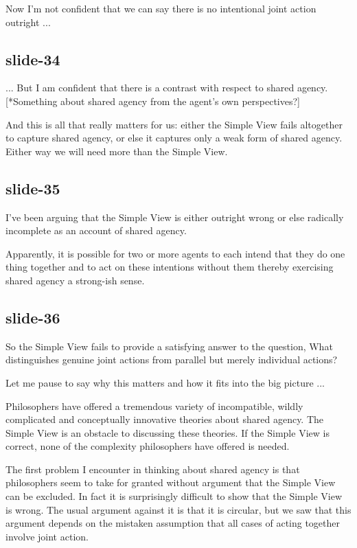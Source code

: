 \documentclass[12pt,\papersize]{extarticle}
\begin{document}
Now I’m not confident that we can say there is no intentional joint action
outright ...

\subsection{slide-34}
...  But I am confident that there is a contrast with respect to shared agency.
[*Something about shared agency from the agent’s own perspectives?]

And this is all that really matters for us: either the Simple View fails altogether
to capture shared agency, or else it captures only a weak form of shared agency.
Either way we will need more than the Simple View.

\subsection{slide-35}
I’ve been arguing that the Simple View is either outright wrong or else radically incomplete
as an account of shared agency.

Apparently, it is possible for two or more agents to each intend that
they do one thing together and to act on these intentions without them thereby
exercising shared agency a strong-ish sense.

\subsection{slide-36}
So the Simple View fails to provide a satisfying answer to the question, What distinguishes
genuine joint actions from parallel but merely individual actions?

Let me pause to say why this matters and how it fits into the big picture ...

Philosophers have offered a tremendous variety of incompatible, wildly complicated and
conceptually innovative theories about shared agency.
The Simple View is an obstacle to discussing these theories.
If the Simple View is correct, none of the complexity philosophers have offered is needed.

The first problem I encounter in thinking about shared agency is that philosophers
seem to take for granted without argument that the Simple View can be excluded.
In fact it is surprisingly difficult to show that the Simple View is wrong.
The usual argument against it is that it is circular, but we saw that this argument
depends on the mistaken assumption that all cases of acting together involve joint action.
\end{document}
